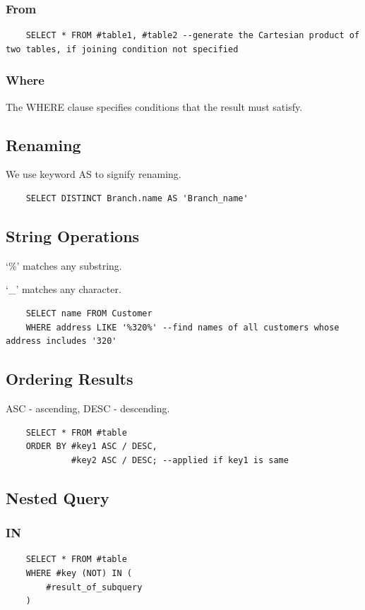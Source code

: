 \documentclass[11pt,a4paper]{article}
\begin{document}
\subsubsection{From}
\begin{lstlisting}
    SELECT * FROM #table1, #table2 --generate the Cartesian product of two tables, if joining condition not specified
\end{lstlisting}

\subsubsection{Where}
The WHERE clause specifies conditions that the result must satisfy.

\subsection{Renaming}
We use keyword AS to signify renaming. 
\begin{lstlisting}
    SELECT DISTINCT Branch.name AS 'Branch_name'
\end{lstlisting}

\subsection{String Operations}
`\%' matches any substring. \par
`\_' matches any character. \par
{}
\begin{lstlisting}
    SELECT name FROM Customer
    WHERE address LIKE '%320%' --find names of all customers whose address includes '320'
\end{lstlisting}

\subsection{Ordering Results}
ASC - ascending, DESC - descending.
\begin{lstlisting}
    SELECT * FROM #table
    ORDER BY #key1 ASC / DESC, 
             #key2 ASC / DESC; --applied if key1 is same
\end{lstlisting}

\subsection{Nested Query}
\subsubsection{IN}
\begin{lstlisting}
    SELECT * FROM #table
    WHERE #key (NOT) IN (
        #result_of_subquery
    )
\end{lstlisting}
\end{document}
